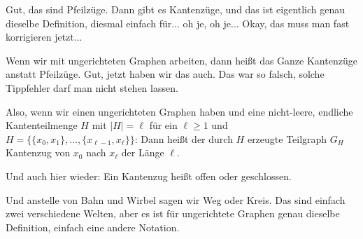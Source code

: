 \begin{spoken-clean}[01:04:52 - 01:06:39]
Gut, das sind Pfeilzüge. Dann gibt es Kantenzüge, und das ist eigentlich genau dieselbe Definition, diesmal einfach für... oh je, oh je...  Okay, das muss man fast korrigieren jetzt... 

Wenn wir mit ungerichteten Graphen arbeiten, dann heißt das Ganze Kantenzüge anstatt Pfeilzüge. Gut, jetzt haben wir das auch. Das war so falsch, solche Tippfehler darf man nicht stehen lassen.

Also, wenn wir einen ungerichteten Graphen haben und eine nicht-leere, endliche Kantenteilmenge $H$ mit $|H| = \ell$ für ein $\ell \ge 1$ und $H = \{\{x_0, x_1\}, \dots, \{x_{\ell-1}, x_\ell\}\}$: Dann heißt der durch $H$ erzeugte Teilgraph $G_H$ Kantenzug von $x_0$ nach $x_\ell$ der Länge $\ell$.

Und auch hier wieder: Ein Kantenzug heißt offen oder geschlossen.

Und anstelle von Bahn und Wirbel sagen wir Weg oder Kreis. Das sind einfach zwei verschiedene Welten, aber es ist für ungerichtete Graphen genau dieselbe Definition, einfach eine andere Notation.
\end{spoken-clean}

\begin{math-stroke}
\end{math-stroke}

